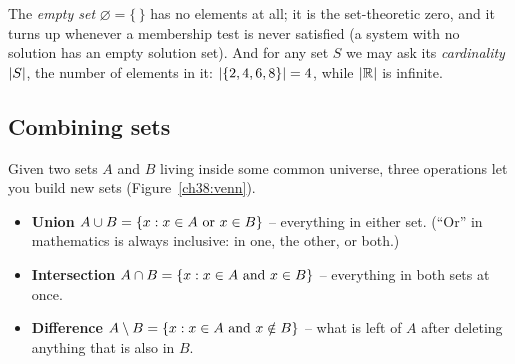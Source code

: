 The \emph{empty set} $\varnothing =
\{\,\}$ has no elements at all; it is the set-theoretic zero, and it turns up whenever a
membership test is never satisfied (a system with no solution has an empty solution set).
And for any set $S$ we may ask its \emph{cardinality} $\lvert S\rvert$, the number of elements in
it: $\lvert\{2,4,6,8\}\rvert = 4$, while $\lvert\mathbb{R}\rvert$ is infinite.

\subsection{Combining sets}

Given two sets $A$ and $B$ living inside some common universe, three operations let you
build new sets (Figure~\ref{ch38:venn}).

\begin{itemize}
  \item \textbf{Union} $A \cup B = \{x : x \in A \text{ or } x \in B\}$ -- everything in
        either set. (``Or'' in mathematics is always inclusive: in one, the other, or
        both.)
  \item \textbf{Intersection} $A \cap B = \{x : x \in A \text{ and } x \in B\}$ --
        everything in both sets at once.
  \item \textbf{Difference} $A \setminus B = \{x : x \in A \text{ and } x \notin B\}$ --
        what is left of $A$ after deleting anything that is also in $B$.
\end{itemize}

